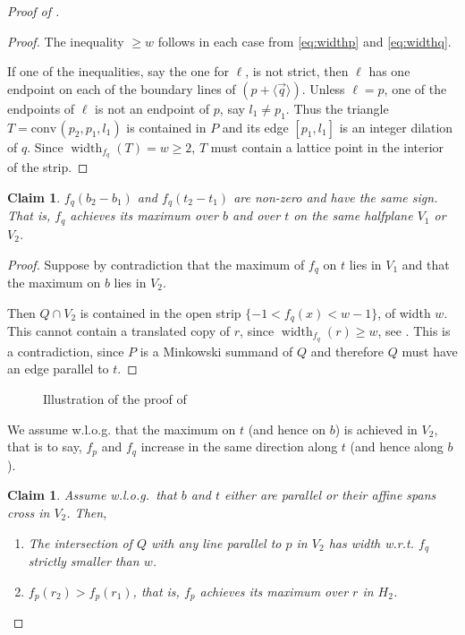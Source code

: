 \documentclass{amsart}
\theoremstyle{plain}
\newtheorem{claim}[theorem]{Claim}
\theoremstyle{definition}
\newcommand{\width}{\operatorname{width}}
\renewcommand{\vec}[1]{\overrightarrow#1}
\newcommand{\vecline}[1]{\langle \vec #1 \rangle}
\newcommand{\conv}{\ensuremath{\mathrm{conv}}\hspace{1pt}}
\begin{document}
\begin{proof}[Proof of ]
\begin{proof}
The inequality $\geq w$ follows in each case from \eqref{eq:widthp} and \eqref{eq:widthq}.

If one of the inequalities, say the one for $\ell$, is not strict, then $\ell$ has one endpoint on each of the boundary lines of $(p + \vecline q)$. Unless $\ell = p$, one of the endpoints of $\ell$ is not an endpoint of $p$, say $l_1 \neq p_1$. Thus the triangle $T=\conv(p_2, p_1, l_1)$ is contained in $P$ and its edge $[p_1, l_1]$ is an integer dilation of $q$. Since $\width_{f_q}(T) =w \geq 2$, $T$ must contain a lattice point in the interior of the strip.
\end{proof}


\begin{claim}
\label{claim:b_and_t}
$f_q(b_2-b_1)$ and $f_q(t_2 - t_1)$ are non-zero and have the same sign. That is, $f_q$ achieves its maximum over $b$ and over $t$ on the same halfplane $V_1$ or $V_2$.
\end{claim}



\begin{proof}
Suppose by contradiction that the maximum of $f_q$ on $t$  lies in $V_1$ and that the maximum on $b$ lies in $V_2$. 

Then $Q \cap V_2$ is contained in the open strip $\{-1<f_q(x)<w-1\}$, of width $w$. This cannot contain a translated copy of $r$, since $\width_{f_q}(r) \geq w$, see . This is a contradiction, since $P$ is a Minkowski summand of $Q$ and therefore $Q$ must have an edge parallel to $t$.
\end{proof}

\begin{figure}[htb]
\scalebox{.75}{}
\caption{Illustration of the proof of }
\label{fig:claim2}
\end{figure}



We assume w.l.o.g. that the maximum on $t$ (and hence on $b$) is achieved in $V_2$, that is to say, $f_p$ and $f_q$ increase in the same direction along $t$ (and hence along $b$). 

\begin{claim}
\label{claim:r}
Assume w.l.o.g.~that $b$ and $t$ either are parallel or their affine spans cross in $V_2$. Then, 
\begin{enumerate}
\item The intersection of $Q$ with any line parallel to $p$ in $V_2$ has width w.r.t. $f_q$ strictly smaller than $w$.
\item $f_p(r_2) > f_p(r_1)$, that is, $f_p$ achieves its maximum over $r$ in $H_2$.
\end{enumerate}
\end{claim}


\end{proof}
\end{document}
